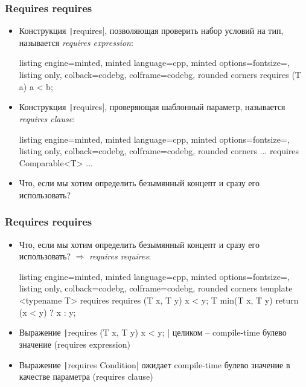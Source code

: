 \documentclass[10pt]{beamer}
\begin{document}
\begin{frame}[fragile]
\frametitle{Requires requires}
\begin{itemize}
\item Конструкция \texttt|requires|, позволяющая проверить набор условий на тип, называется \textit{requires expression}:
\begin{tcblisting}{listing engine=minted, minted language=cpp, minted options={fontsize=\scriptsize}, listing only, colback=codebg, colframe=codebg, rounded corners}
requires (T a) { a < b; }
\end{tcblisting}
\pause
\item Конструкция \texttt|requires|, проверяющая шаблонный параметр, называется \textit{requires clause}:
\begin{tcblisting}{listing engine=minted, minted language=cpp, minted options={fontsize=\scriptsize}, listing only, colback=codebg, colframe=codebg, rounded corners}
...
requires Comparable<T>
...
\end{tcblisting}
\pause
\item Что, если мы хотим определить безымянный концепт и сразу его использовать?
\end{itemize}
\end{frame}

\begin{frame}[fragile]
\frametitle{Requires requires}
\begin{itemize}
\item Что, если мы хотим определить безымянный концепт и сразу его использовать? \pause \(\Longrightarrow\) \textit{requires requires}:
\begin{tcblisting}{listing engine=minted, minted language=cpp, minted options={fontsize=\scriptsize}, listing only, colback=codebg, colframe=codebg, rounded corners}
template <typename T>
requires requires (T x, T y) { x < y; }
T min(T x, T y) {
  return (x < y) ? x : y;
}
\end{tcblisting}
\pause
{}
\item Выражение \texttt|requires (T x, T y) { x < y; }| целиком -- compile-time булево значение (requires expression)
\pause
\item Выражение \texttt|requires Condition| ожидает compile-time булево значение в качестве параметра (requires clause)
\end{itemize}
\end{frame}
\end{document}
